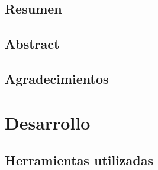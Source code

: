 

\usepackage[
backend=biber,
style=numeric,
sorting=none,
dateabbrev=false,
citestyle=numeric
]{biblatex}




\usepackage[font=footnotesize, skip=4pt, justification=centering]{caption}

\raggedbottom




\pagestyle{fancy}

\maketitle

\chapter*{Resumen}
\setcounter{page}{3} %





\chapter*{Abstract}

\chapter*{Agradecimientos}


\tableofcontents

\cleardoublepage
{} %
\listoffigures %

\cleardoublepage
{} %
\listoftables %



\part{Desarrollo}

\chapter{Herramientas utilizadas}

